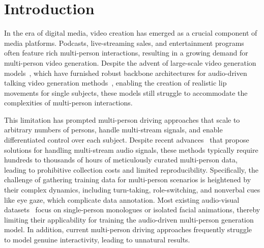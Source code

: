 \section{Introduction}
\label{sec:intro}
In the era of digital media, video creation has emerged as a crucial component of media platforms. 
Podcasts, live-streaming sales, and entertainment programs often feature rich multi-person interactions, resulting in a growing demand for multi-person video generation.
Despite the advent of large-scale video generation models~\cite{blattmann2023stable, yangcogvideox, kong2024hunyuanvideo, wan2025wan}, which have furnished robust backbone architectures for audio-driven talking video generation methods~\cite{lin2025omnihuman, gan2025omniavatar, jiang2025omnihuman, yang2025infinitetalk, cui2025hallo3, chen2025hunyuanvideo, ji2025sonic, gao2025wan, kong2025let}, enabling the creation of realistic lip movements for single subjects, these models still struggle to accommodate the complexities of multi-person interactions.

This limitation has prompted multi-person driving approaches that scale to arbitrary numbers of persons, handle multi-stream signals, and enable differentiated control over each subject.
Despite recent advances~\cite{wang2025interacthuman, huang2025bind, kong2025let} that propose solutions for handling multi-stream audio signals, these methods typically require hundreds to thousands of hours of meticulously curated multi-person data, leading to prohibitive collection costs and limited reproducibility. 
Specifically, the challenge of gathering training data for multi-person scenarios is heightened by their complex dynamics, including turn-taking, role-switching, and nonverbal cues like eye gaze, which complicate data annotation. 
Most existing audio-visual datasets~\cite{zhang2021flow, xie2022vfhq, cui2025hallo3, meng2025echomimicv2, li2025openhumanvid, chung2018voxceleb2} focus on single-person monologues or isolated facial animations, thereby limiting their applicability for training the audio-driven multi-person generation model. 
In addition, current multi-person driving approaches frequently struggle to model genuine interactivity, leading to unnatural results.

